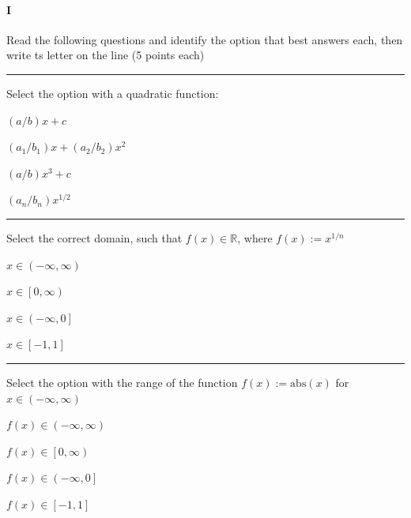 
\paragraph{I} Read the following questions and identify the option that best answers each, then write ts letter on the line (5 points each)

\begin{preguntas}

\pregunta[5] \rule{1cm}{0.1mm} Select the option with a quadratic function:

\begin{enumerate*}[label=(\alph*)]
    \item $(a/b)x + c\qquad$
    \item $(a_1/b_1)x + (a_2/b_2)x^2\qquad$
    \item $(a/b)x^3 + c\qquad$
    \item $(a_n/b_n)x^{1/2}\qquad$
\end{enumerate*}

\pregunta[5] \rule{1cm}{0.1mm} Select the correct domain, such that $f(x)\in\mathbb{R}$, where $f(x):=x^{1/n}$

\begin{enumerate*}[label=(\alph*)]
    \item $x\in\left(-\infty,\infty\right)\qquad$
    \item $x\in\left[0,\infty\right)\qquad$
    \item $x\in\left(-\infty,0\right]\qquad$
    \item $x\in\left[-1,1\right]\qquad$
\end{enumerate*}

\pregunta[5] \rule{1cm}{0.1mm} Select the option with the range of the function $f(x):=\mathrm{abs}(x)$ for $x\in\left(-\infty,\infty\right)$

\begin{enumerate*}[label=(\alph*)]
    \item $f(x)\in\left(-\infty,\infty\right)\qquad$
    \item $f(x)\in\left[0,\infty\right)\qquad$
    \item $f(x)\in\left(-\infty,0\right]\qquad$
    \item $f(x)\in\left[-1,1\right]\qquad$
\end{enumerate*}


\end{preguntas}
